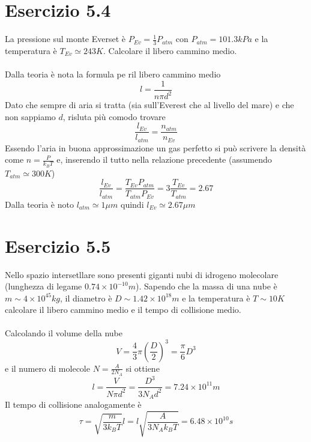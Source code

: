 \documentclass[a4paper]{article}
\begin{document}
    \section*{Esercizio 5.4}
        La pressione sul monte Everset è $P_{Ev}=\frac{1}{3}P_{atm}$ con $P_{atm}=101.3kPa$ e la temperatura è $T_{Ev}\simeq 243K$.
        Calcolare il libero cammino medio.
        \\
        \\
        Dalla teoria è nota la formula pe ril libero cammino medio
        \begin{equation*}
            l=\frac{1}{n\pi d^2}
        \end{equation*}
        Dato che sempre di aria si tratta (sia sull'Everest che al livello del mare) e che non sappiamo $d$, risluta più comodo trovare
        \begin{equation*}
            \frac{l_{Ev}}{l_{atm}}=\frac{n_{atm}}{n_{Ev}}
        \end{equation*}
        Essendo l'aria in buona approssimazione un gas perfetto si può scrivere la densità come $n=\frac{P}{k_BT}$ e, inserendo il tutto nella relazione precedente (assumendo $T_{atm}\simeq300K$)
        \begin{equation*}
            \frac{l_{Ev}}{l_{atm}}=\frac{T_{Ev}P_{atm}}{T_{atm}P_{Ev}}=3\frac{T_{Ev}}{T_{atm}}=2.67
        \end{equation*}
        Dalla teoria è noto $l_{atm}\simeq 1\mu m$ quindi $l_{Ev}\simeq 2.67\mu m$

    \section*{Esercizio 5.5}
        Nello spazio intersetllare sono presenti giganti nubi di idrogeno molecolare (lunghezza di legame $0.74\times 10^{-10}m$).
        Sapendo che la massa di una nube è $m\sim 4\times 10^{45}kg$, il diametro è $D\sim 1.42\times 10^{18}m$ e la temperatura è $T\sim 10K$ calcolare il libero cammino medio e il tempo di collisione medio.
        \\
        \\
        Calcolando il volume della nube
        \begin{equation*}
            V=\frac{4}{3}\pi\left(\frac{D}{2}\right)^3=\frac{\pi}{6}D^3
        \end{equation*}
        e il numero di molecole $N=\frac{A}{2N_A}$ si ottiene
        \begin{equation*}
            l=\frac{V}{N\pi d^2}=\frac{D^3}{3N_Ad^2}=7.24\times 10^{11}m
        \end{equation*}
        Il tempo di collisione analogamente è
        \begin{equation*}
            \tau=\sqrt{\frac{m}{3k_BT}}l=l\sqrt{\frac{A}{3N_Ak_BT}}=6.48\times 10^{10}s
        \end{equation*}
\end{document}

